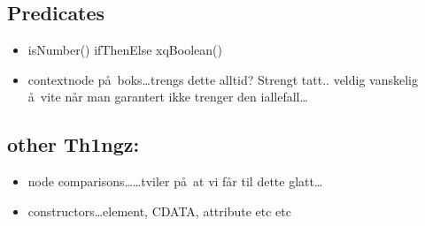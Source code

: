 \subsection{Predicates}
\label{sect:trans:TD:predicates}
\begin{itemize}
  \item isNumber() ifThenElse xqBoolean()
  \item contextnode p\aa~boks\ldots trengs dette alltid? Strengt tatt.. veldig vanskelig \aa~vite n\aa r man
  garantert ikke trenger den iallefall\ldots
\end{itemize}


\subsection{other Th1ngz:}
\begin{itemize}
  \item node comparisons\ldots\ldots tviler p\aa~at vi f\aa r til dette glatt\ldots
  \item constructors\ldots element, CDATA, attribute etc etc
\end{itemize}


